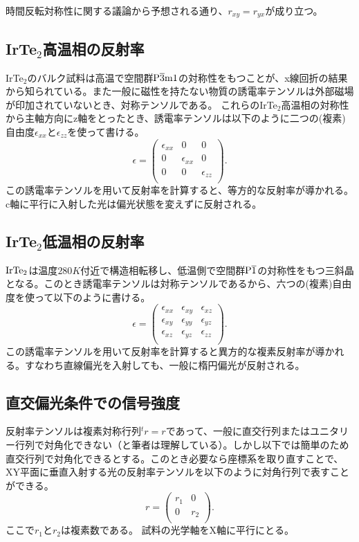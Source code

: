 \documentclass[11pt,a4paper]{jsarticle}
\begin{document}
時間反転対称性に関する議論から予想される通り、$r_{xy}=r_{yx}$が成り立つ。

\subsection{IrTe$_2$高温相の反射率}
\label{sec:IrTe2_reflectance_HT}
IrTe$_2$のバルク試料は高温で空間群$\rm P\overline{3}m1$の対称性をもつことが、x線回折の結果から知られている\cite{space_group_IrTe2}。また一般に磁性を持たない物質の誘電率テンソルは外部磁場が印加されていないとき、対称テンソルである\cite{landau}。
これらのIrTe$_2$高温相の対称性から主軸方向にz軸をとったとき、誘電率テンソルは以下のように二つの(複素)自由度$\epsilon_{xx}$と$\epsilon_{zz}$を使って書ける。
\[
  \epsilon = \left(
    \begin{array}{ccc}
      \epsilon_{xx} & 0 & 0 \\
      0 & \epsilon_{xx} & 0\\
      0 & 0 & \epsilon_{zz} \\
    \end{array}
  \right).
\]
この誘電率テンソルを用いて反射率を計算すると、等方的な反射率が導かれる。c軸に平行に入射した光は偏光状態を変えずに反射される。

\subsection{IrTe$_2$低温相の反射率}
\label{sec:IrTe2_reflectance_LT}
$\rm IrTe_2$は温度$280K$付近で構造相転移し、低温側で空間群$\rm P\overline{1}$の対称性をもつ三斜晶となる\cite{space_group_IrTe2}。このとき誘電率テンソルは対称テンソルであるから、六つの(複素)自由度を使って以下のように書ける。
\[
  \epsilon = \left(
    \begin{array}{ccc}
      \epsilon_{xx} & \epsilon_{xy} & \epsilon_{xz} \\
      \epsilon_{xy} & \epsilon_{yy} & \epsilon_{yz} \\
      \epsilon_{xz} & \epsilon_{yz} & \epsilon_{zz} \\
    \end{array}
  \right).
\]
この誘電率テンソルを用いて反射率を計算すると異方的な複素反射率が導かれる。すなわち直線偏光を入射しても、一般に楕円偏光が反射される。

\subsection{直交偏光条件での信号強度}
\label{sec:diagonazed_reflectance}
反射率テンソルは複素対称行列${}^t r=r$であって、一般に直交行列またはユニタリー行列で対角化できない（と筆者は理解している）。しかし以下では簡単のため直交行列で対角化できるとする。このとき必要なら座標系を取り直すことで、XY平面に垂直入射する光の反射率テンソルを以下のように対角行列で表すことができる。
\[
  r = \left(
    \begin{array}{cc}
      r_1 &0  \\
      0 & r_2  \\
    \end{array} 
  \right) .
\]
ここで$r_1$と$r_2$は複素数である。 試料の光学軸をX軸に平行にとる。
\end{document}
